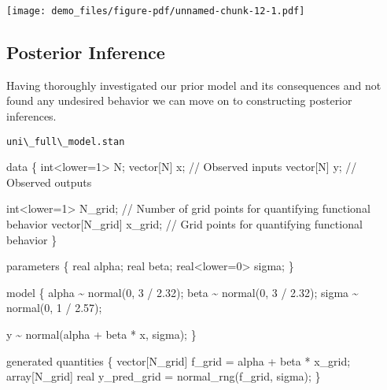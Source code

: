 \documentclass[
  letterpaper,
  DIV=11,
  numbers=noendperiod]{scrartcl}
\newenvironment{Shaded}{\begin{snugshade}}{\end{snugshade}}
\newcommand{\CommentTok}[1]{\textcolor[rgb]{0.37,0.37,0.37}{#1}}
\newcommand{\DataTypeTok}[1]{\textcolor[rgb]{0.68,0.00,0.00}{#1}}
\newcommand{\DecValTok}[1]{\textcolor[rgb]{0.68,0.00,0.00}{#1}}
\newcommand{\FloatTok}[1]{\textcolor[rgb]{0.68,0.00,0.00}{#1}}
\newcommand{\KeywordTok}[1]{\textcolor[rgb]{0.00,0.23,0.31}{#1}}
\newcommand{\NormalTok}[1]{\textcolor[rgb]{0.00,0.23,0.31}{#1}}
\begin{document}
\texttt{[image: demo\_files/figure-pdf/unnamed-chunk-12-1.pdf]}

\subsection{Posterior Inference}\label{posterior-inference}

Having thoroughly investigated our prior model and its consequences and
not found any undesired behavior we can move on to constructing
posterior inferences.

\begin{codelisting}

\caption{\texttt{uni\textbackslash\_full\textbackslash\_model.stan}}

\begin{Shaded}
\begin{Highlighting}[]
\KeywordTok{data}\NormalTok{ \{}
  \DataTypeTok{int}\NormalTok{\textless{}}\KeywordTok{lower}\NormalTok{=}\DecValTok{1}\NormalTok{\textgreater{} N;}
  \DataTypeTok{vector}\NormalTok{[N] x; }\CommentTok{// Observed inputs}
  \DataTypeTok{vector}\NormalTok{[N] y; }\CommentTok{// Observed outputs}
  
  \DataTypeTok{int}\NormalTok{\textless{}}\KeywordTok{lower}\NormalTok{=}\DecValTok{1}\NormalTok{\textgreater{} N\_grid; }\CommentTok{// Number of grid points for quantifying functional behavior}
  \DataTypeTok{vector}\NormalTok{[N\_grid] x\_grid; }\CommentTok{// Grid points for quantifying functional behavior}
\NormalTok{\}}

\KeywordTok{parameters}\NormalTok{ \{ }
  \DataTypeTok{real}\NormalTok{ alpha;}
  \DataTypeTok{real}\NormalTok{ beta;}
  \DataTypeTok{real}\NormalTok{\textless{}}\KeywordTok{lower}\NormalTok{=}\DecValTok{0}\NormalTok{\textgreater{} sigma;}
\NormalTok{\}}

\KeywordTok{model}\NormalTok{ \{}
\NormalTok{  alpha \textasciitilde{} normal(}\DecValTok{0}\NormalTok{, }\DecValTok{3}\NormalTok{ / }\FloatTok{2.32}\NormalTok{);}
\NormalTok{  beta \textasciitilde{} normal(}\DecValTok{0}\NormalTok{, }\DecValTok{3}\NormalTok{ / }\FloatTok{2.32}\NormalTok{);}
\NormalTok{  sigma \textasciitilde{} normal(}\DecValTok{0}\NormalTok{, }\DecValTok{1}\NormalTok{ / }\FloatTok{2.57}\NormalTok{);}
  
\NormalTok{  y \textasciitilde{} normal(alpha + beta * x, sigma);}
\NormalTok{\}}

\KeywordTok{generated quantities}\NormalTok{ \{}
  \DataTypeTok{vector}\NormalTok{[N\_grid] f\_grid = alpha + beta * x\_grid;}
  \DataTypeTok{array}\NormalTok{[N\_grid] }\DataTypeTok{real}\NormalTok{ y\_pred\_grid = normal\_rng(f\_grid, sigma);}
\NormalTok{\}}
\end{Highlighting}
\end{Shaded}

\end{codelisting}
\end{document}
